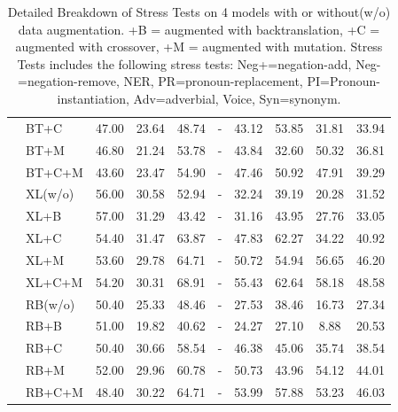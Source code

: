 \begin{table}[th]
\begin{tabular}{ll|c|ccccccc}
&BT+C&47.00 &23.64 &48.74 &-&43.12 &53.85 &31.81 &33.94\\ 
&BT+M&46.80 &21.24 &53.78 &-&43.84 &32.60 &50.32 &36.81\\ 
&BT+C+M&43.60 &23.47 &54.90 &-&47.46 &50.92 &47.91 &39.29\\ 
\cline{2-10}
&XL(w/o)&56.00 &30.58 &52.94 &-&32.24 &39.19 &20.28 &31.52\\ 
&XL+B&57.00 &31.29 &43.42 &-&31.16 &43.95 &27.76 &33.05\\ 
&XL+C&54.40 &31.47 &63.87 &-&47.83 &62.27 &34.22 &40.92\\ 
&XL+M&53.60 &29.78 &64.71 &-&50.72 &54.94 &56.65 &46.20\\ 
&XL+C+M&54.20 &30.31 &68.91 &-&55.43 &62.64 &58.18 &48.58\\ 
\cline{2-10}
&RB(w/o)&50.40 &25.33 &48.46 &-&27.53 &38.46 &16.73 &27.34\\ 
&RB+B&51.00 &19.82 &40.62 &-&24.27 &27.10 &8.88 &20.53\\ 
&RB+C&50.40 &30.66 &58.54 &-&46.38 &45.06 &35.74 &38.54\\ 
&RB+M&52.00 &29.96 &60.78 &-&50.73 &43.96 &54.12 &44.01\\ 
&RB+C+M&48.40 &30.22 &64.71 &-&53.99 &57.88 &53.23 &46.03\\ 



\bottomrule
\hline
\end{tabular}
\caption{\label{tab:results} Detailed Breakdown of Stress Tests
on 4 models with or without(w/o) data augmentation. 
+B = augmented with backtranslation,
+C = augmented with crossover, +M = augmented with mutation. 
Stress Tests includes the following stress tests: 
Neg+=negation-add, Neg-=negation-remove, NER, 
PR=pronoun-replacement, PI=Pronoun-instantiation, Adv=adverbial, Voice, Syn=synonym.}
\end{table}




